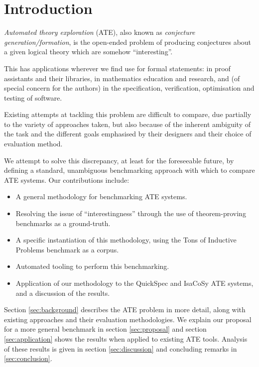 \section{Introduction}
\label{intro}


\emph{Automated theory exploration} (ATE), also known as
\emph{conjecture generation/formation}, is the open-ended problem of producing
conjectures about a given logical theory which are somehow ``interesting''.

This has applications wherever we find use for formal statements: in proof
assistants and their libraries, in mathematics education and research, and
(of special concern for the authors) in the specification, verification,
optimisation and testing of software.

Existing attempts at tackling this problem are difficult to compare, due
partially to the variety of approaches taken, but also because of the inherent
ambiguity of the task and the different goals emphasised by their designers and
their choice of evaluation method.

We attempt to solve this discrepancy, at least for the foreseeable future, by
defining a standard, unambiguous benchmarking approach with which to compare
ATE systems. Our contributions include:

\begin{itemize}
\item A general methodology for benchmarking ATE systems.
\item Resolving the issue of ``interestingness'' through the use of
  theorem-proving benchmarks as a ground-truth.
\item A specific instantiation of this methodology, using the Tons of Inductive
  Problems benchmark as a corpus.
\item Automated tooling to perform this benchmarking.
\item Application of our methodology to the QuickSpec and IsaCoSy ATE systems,
  and a discussion of the results.
\end{itemize}

Section \ref{sec:background} describes the ATE problem in more detail, along
with existing approaches and their evaluation methodologies. We explain our
proposal for a more general benchmark in section \ref{sec:proposal} and
section \ref{sec:application} shows the results when applied to existing ATE
tools. Analysis of these results is given in section \ref{sec:discussion} and
concluding remarks in \ref{sec:conclusion}.

